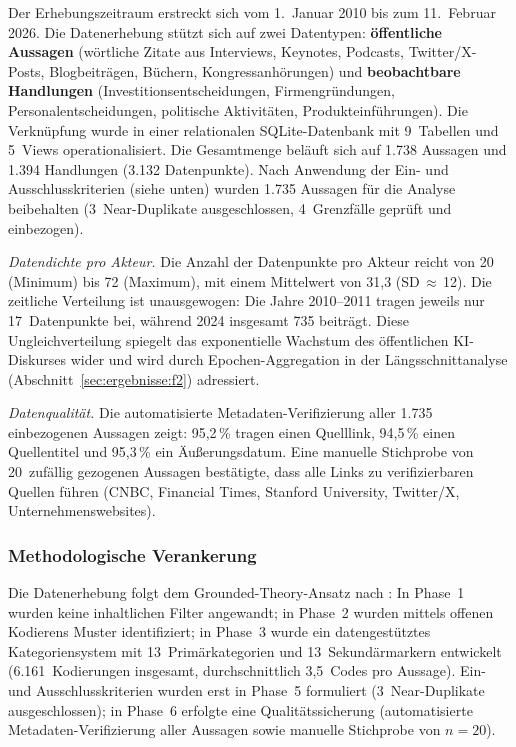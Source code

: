 \documentclass[12pt,a4paper]{article}
\begin{document}
Der Erhebungszeitraum erstreckt sich vom 1.~Januar 2010 bis zum 11.~Februar 2026. Die Datenerhebung st\"utzt sich auf zwei Datentypen: \textbf{\"offentliche Aussagen} (w\"ortliche Zitate aus Interviews, Keynotes, Podcasts, Twitter/X-Posts, Blogbeitr\"agen, B\"uchern, Kongressanh\"orungen) und \textbf{beobachtbare Handlungen} (Investitionsentscheidungen, Firmengr\"undungen, Personalentscheidungen, politische Aktivit\"aten, Produkteinf\"uhrungen). Die Verkn\"upfung wurde in einer relationalen SQLite-Datenbank mit 9~Tabellen und 5~Views operationalisiert. Die Gesamtmenge bel\"auft sich auf 1.738 Aussagen und 1.394 Handlungen (3.132 Datenpunkte). Nach Anwendung der Ein- und Ausschlusskriterien (siehe unten) wurden 1.735 Aussagen f\"ur die Analyse beibehalten (3~Near-Duplikate ausgeschlossen, 4~Grenzf\"alle gepr\"uft und einbezogen).

\emph{Datendichte pro Akteur.} Die Anzahl der Datenpunkte pro Akteur reicht von 20 (Minimum) bis 72 (Maximum), mit einem Mittelwert von 31,3 (SD\,$\approx$\,12). Die zeitliche Verteilung ist unausgewogen: Die Jahre 2010--2011 tragen jeweils nur 17~Datenpunkte bei, w\"ahrend 2024 insgesamt 735 beitr\"agt. Diese Ungleichverteilung spiegelt das exponentielle Wachstum des \"offentlichen KI-Diskurses wider und wird durch Epochen-Aggregation in der L\"angsschnittanalyse (Abschnitt~\ref{sec:ergebnisse:f2}) adressiert.

\emph{Datenqualit\"at.} Die automatisierte Metadaten-Verifizierung aller 1.735 einbezogenen Aussagen zeigt: 95,2\,\% tragen einen Quelllink, 94,5\,\% einen Quellentitel und 95,3\,\% ein \"Au\ss{}erungsdatum. Eine manuelle Stichprobe von 20~zuf\"allig gezogenen Aussagen best\"atigte, dass alle Links zu verifizierbaren Quellen f\"uhren (CNBC, Financial Times, Stanford University, Twitter/X, Unternehmenswebsites).

\subsubsection{Methodologische Verankerung}

Die Datenerhebung folgt dem Grounded-Theory-Ansatz nach \citet{StraussCorbin1990}: In Phase~1 wurden keine inhaltlichen Filter angewandt; in Phase~2 wurden mittels offenen Kodierens Muster identifiziert; in Phase~3 wurde ein datengest\"utztes Kategoriensystem mit 13~Prim\"arkategorien und 13~Sekund\"armarkern entwickelt (6.161~Kodierungen insgesamt, durchschnittlich 3,5~Codes pro Aussage). Ein- und Ausschlusskriterien wurden erst in Phase~5 formuliert (3~Near-Duplikate ausgeschlossen); in Phase~6 erfolgte eine Qualit\"atssicherung (automatisierte Metadaten-Verifizierung aller Aussagen sowie manuelle Stichprobe von $n = 20$).
\end{document}
